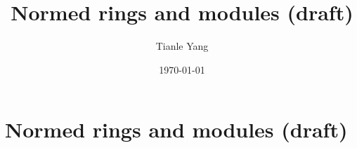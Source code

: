 \documentclass{noteformyself}
\title{Normed rings and modules (draft)}
\author{Tianle Yang}
\date{\today}
\begin{document}
    \maketitle

    \section{Normed rings and modules (draft)}



\end{document}

